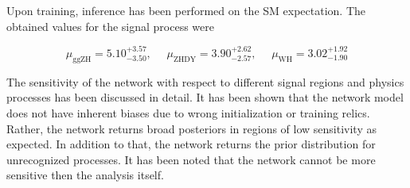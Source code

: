 Upon training, inference has been performed on the SM expectation. The obtained values for the signal process were

\begin{equation*}
		\mu_\text{ggZH} = 5.10^{+3.57}_{-3.50}, \, \, \quad \mu_\text{ZHDY} = 3.90^{+2.62}_{-2.57}, \, \, \quad \mu_\text{WH} = 3.02^{+1.92}_{-1.90} 
\end{equation*}

The sensitivity of the network with respect to different signal regions and physics processes has been discussed in detail. It has been shown that the network model does not have inherent biases due to wrong initialization or training relics. Rather, the network returns broad posteriors in regions of low sensitivity as expected. In addition to that, the network returns the prior distribution for unrecognized processes. It has been noted that the network cannot be more sensitive then the analysis itself.